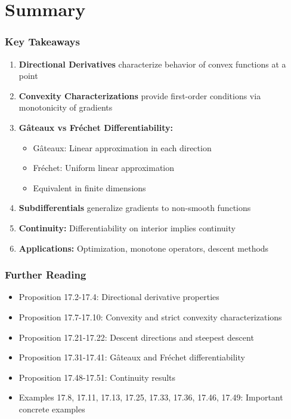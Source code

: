 \documentclass[aspectratio=169,10pt]{beamer}
\begin{document}
\section{Summary}
\begin{frame}
  \frametitle{Key Takeaways}

  \begin{enumerate}
    \item \textbf{Directional Derivatives} characterize behavior of convex functions at a point
    \item \textbf{Convexity Characterizations} provide first-order conditions via monotonicity of gradients
    \item \textbf{Gâteaux vs Fréchet Differentiability:}
      \begin{itemize}
        \item Gâteaux: Linear approximation in each direction
        \item Fréchet: Uniform linear approximation
        \item Equivalent in finite dimensions
      \end{itemize}
    \item \textbf{Subdifferentials} generalize gradients to non-smooth functions
    \item \textbf{Continuity:} Differentiability on interior implies continuity
    \item \textbf{Applications:} Optimization, monotone operators, descent methods
  \end{enumerate}
\end{frame}

\begin{frame}
  \frametitle{Further Reading}

  \begin{itemize}
    \item Proposition 17.2-17.4: Directional derivative properties
    \item Proposition 17.7-17.10: Convexity and strict convexity characterizations
    \item Proposition 17.21-17.22: Descent directions and steepest descent
    \item Proposition 17.31-17.41: Gâteaux and Fréchet differentiability
    \item Proposition 17.48-17.51: Continuity results
    \item Examples 17.8, 17.11, 17.13, 17.25, 17.33, 17.36, 17.46, 17.49: Important concrete examples
  \end{itemize}
\end{frame}
\end{document}
